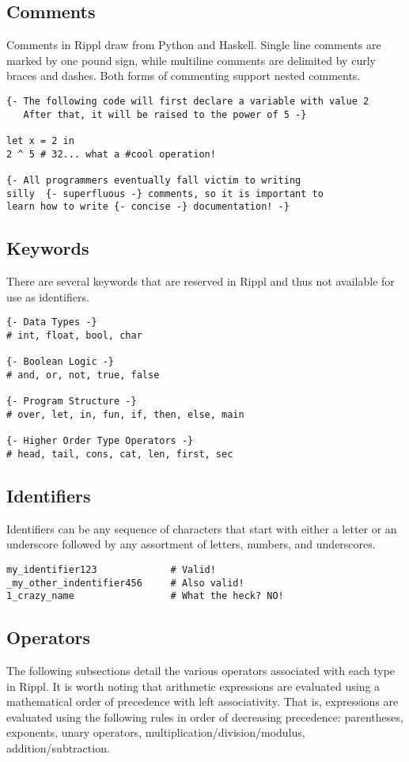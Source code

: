 \documentclass[5pt]{article}
\begin{document}
\newpage 
\subsection{Comments}
Comments in Rippl draw from Python and Haskell. Single line comments are marked by one pound sign, while multiline comments are delimited by curly braces and dashes. Both forms of commenting support nested comments.
\begin{lstlisting}[language=rippl]
{- The following code will first declare a variable with value 2
   After that, it will be raised to the power of 5 -}
   
let x = 2 in
2 ^ 5 # 32... what a #cool operation!

{- All programmers eventually fall victim to writing 
silly  {- superfluous -} comments, so it is important to 
learn how to write {- concise -} documentation! -}
\end{lstlisting}
\subsection{Keywords}
There are several keywords that are reserved in Rippl and thus not available for use as identifiers.
\begin{lstlisting}[language=rippl]
{- Data Types -}
# int, float, bool, char

{- Boolean Logic -}
# and, or, not, true, false

{- Program Structure -}
# over, let, in, fun, if, then, else, main

{- Higher Order Type Operators -}
# head, tail, cons, cat, len, first, sec
\end{lstlisting}
\subsection{Identifiers}
Identifiers can be any sequence of characters that start with either a letter or an underscore followed by any assortment of letters, numbers, and underscores.
\begin{lstlisting}[language=rippl]
my_identifier123             # Valid!
_my_other_indentifier456     # Also valid!
1_crazy_name                 # What the heck? NO!
\end{lstlisting}
\newpage
\subsection{Operators}
The following subsections detail the various operators associated with each type in Rippl. It is worth noting that arithmetic expressions are evaluated using a mathematical
order of precedence with left associativity. That is, expressions are evaluated using the following rules in order of decreasing precedence: parentheses, exponents, unary operators, multiplication/division/modulus, addition/subtraction. 
\end{document}
